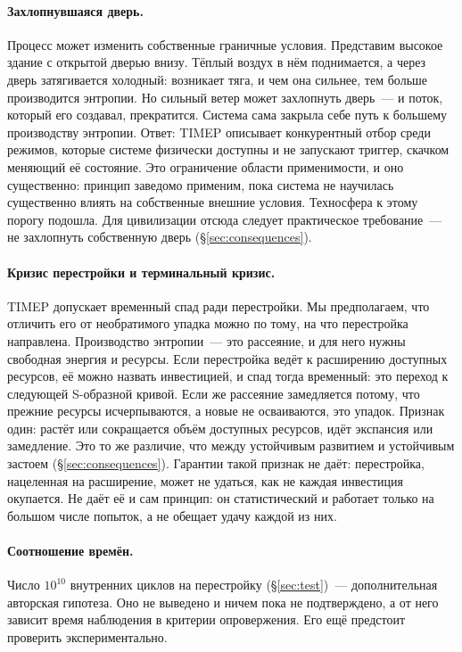\documentclass[11pt,a4paper]{article}
\newcommand{\Sref}[1]{\hyperref[#1]{\S\ref{#1}}}
\begin{document}
\paragraph{Захлопнувшаяся дверь.}
Процесс может изменить собственные граничные условия. Представим высокое здание с открытой дверью внизу. Тёплый воздух в нём поднимается, а через дверь затягивается холодный: возникает тяга, и чем она сильнее, тем больше производится энтропии. Но сильный ветер может захлопнуть дверь~--- и поток, который его создавал, прекратится. Система сама закрыла себе путь к большему производству энтропии. Ответ: TIMEP описывает конкурентный отбор среди режимов, которые системе физически доступны и не запускают триггер, скачком меняющий её состояние. Это ограничение области применимости, и оно существенно: принцип заведомо применим, пока система не научилась существенно влиять на собственные внешние условия. Техносфера к этому порогу подошла. Для цивилизации отсюда следует практическое требование~--- не захлопнуть собственную дверь (\Sref{sec:consequences}).

\paragraph{Кризис перестройки и терминальный кризис.}
TIMEP допускает временный спад ради перестройки. Мы предполагаем, что отличить его от необратимого упадка можно по тому, на что перестройка направлена. Производство энтропии~--- это рассеяние, и для него нужны свободная энергия и ресурсы. Если перестройка ведёт к расширению доступных ресурсов, её можно назвать инвестицией, и спад тогда временный: это переход к следующей S-образной кривой. Если же рассеяние замедляется потому, что прежние ресурсы исчерпываются, а новые не осваиваются, это упадок. Признак один: растёт или сокращается объём доступных ресурсов, идёт экспансия или замедление. Это то же различие, что между устойчивым развитием и устойчивым застоем (\Sref{sec:consequences}). Гарантии такой признак не даёт: перестройка, нацеленная на расширение, может не удаться, как не каждая инвестиция окупается. Не даёт её и сам принцип: он статистический и работает только на большом числе попыток, а не обещает удачу каждой из них.

\paragraph{Соотношение времён.}
Число $10^{10}$ внутренних циклов на перестройку (\Sref{sec:test})~--- дополнительная авторская гипотеза. Оно не выведено и ничем пока не подтверждено, а от него зависит время наблюдения в критерии опровержения. Его ещё предстоит проверить экспериментально.
\end{document}
